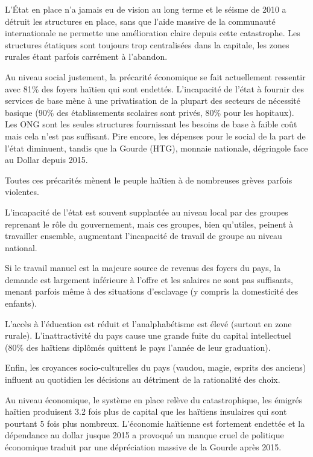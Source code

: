 \documentclass[a4paper, 11pt]{article}
\begin{document}
  L'\'Etat en place n'a jamais eu de vision au long terme et le séisme de 2010 a détruit les structures en place, sans que l'aide massive de la communauté internationale ne permette une amélioration claire depuis cette catastrophe. Les structures étatiques sont toujours trop centralisées dans la capitale, les zones rurales étant parfois carrément à l'abandon.

  Au niveau social justement, la précarité économique se fait actuellement ressentir avec 81\% des foyers haïtien qui sont endettés. L'incapacité de l'état à fournir des services de base mène à une privatisation de la plupart des secteurs de nécessité basique (90\% des établissements scolaires sont privés, 80\% pour les hopitaux). Les ONG sont les seules structures fournissant les besoins de base à faible coût mais cela n'est pas suffisant. Pire encore, les dépenses pour le social de la part de l'état diminuent, tandis que la Gourde (HTG), monnaie nationale, dégringole face au Dollar depuis 2015.

  Toutes ces précarités mènent le peuple haïtien à de nombreuses grèves parfois violentes.

  L'incapacité de l'état est souvent supplantée au niveau local par des groupes reprenant le rôle du gouvernement, mais ces groupes, bien qu'utiles, peinent à travailler ensemble, augmentant l'incapacité de travail de groupe au niveau national.

  Si le travail manuel est la majeure source de revenus des foyers du pays, la demande est largement inférieure à l'offre et les salaires ne sont pas suffisants, menant parfois même à des situations d'esclavage (y compris la domesticité des enfants).

  L'accès à l'éducation est réduit et l'analphabétisme est élevé (surtout en zone rurale). L'inattractivité du pays cause une grande fuite du capital intellectuel (80\% des haïtiens diplômés quittent le pays l'année de leur graduation).

  Enfin, les croyances socio-culturelles du pays (vaudou, magie, esprits des anciens) influent au quotidien les décisions au détriment de la rationalité des choix.

  Au niveau économique, le système en place relève du catastrophique, les émigrés haïtien produisent 3.2 fois plus de capital que les haïtiens insulaires qui sont pourtant 5 fois plus nombreux. L'économie haïtienne est fortement endettée et la dépendance au dollar jusque 2015 a provoqué un manque cruel de politique économique traduit par une dépréciation massive de la Gourde après 2015.
\end{document}
